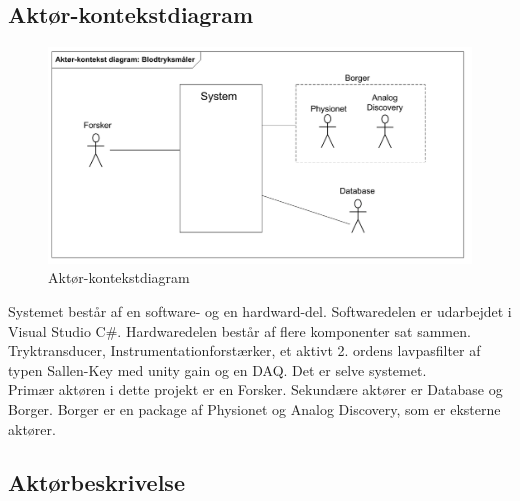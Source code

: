 \subsection{Aktør-kontekstdiagram}
\begin{figure}[H]
	\centering
	\includegraphics[width=1\textwidth]{Figurer/Snip20151008_29}
	\caption{Aktør-kontekstdiagram}
	\label{fig:aktoerbeskrivelse}
\end{figure}

Systemet består af en software- og en hardward-del. Softwaredelen er udarbejdet i Visual Studio C\#. Hardwaredelen består af flere komponenter sat sammen. Tryktransducer, Instrumentationforstærker, et aktivt 2. ordens lavpasfilter af typen Sallen-Key med unity gain og en DAQ. Det er selve systemet. \\
Primær aktøren i dette projekt er en Forsker. Sekundære aktører er Database og Borger. Borger er en package af Physionet og Analog Discovery, som er eksterne aktører.   

\subsection{Aktørbeskrivelse}

